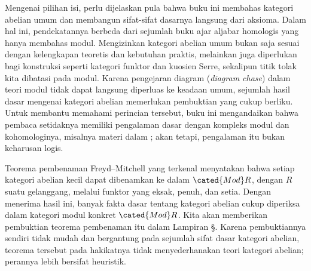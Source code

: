 Mengenai pilihan isi, perlu dijelaskan pula bahwa buku ini membahas
kategori abelian umum dan membangun sifat-sifat dasarnya langsung dari
aksioma. Dalam hal ini, pendekatannya berbeda dari sejumlah buku ajar
aljabar homologis yang hanya membahas modul. Mengizinkan kategori abelian
umum bukan saja sesuai dengan kelengkapan teoretis dan kebutuhan praktis,
melainkan juga diperlukan bagi konstruksi seperti kategori funktor dan
kuosien Serre, sekalipun titik tolak kita dibatasi pada modul. Karena
pengejaran diagram (\emph{diagram chase}) dalam teori modul tidak dapat
langsung diperluas ke keadaan umum, sejumlah hasil dasar mengenai kategori
abelian memerlukan
pembuktian yang cukup berliku. Untuk membantu memahami perincian tersebut,
buku ini mengandaikan bahwa pembaca setidaknya memiliki pengalaman dasar
dengan kompleks modul dan kohomologinya, misalnya materi dalam
\cite[Bab~6]{Li1}; akan tetapi, pengalaman itu bukan keharusan logis.

Teorema pembenaman Freyd--Mitchell yang terkenal menyatakan bahwa setiap
kategori abelian kecil dapat dibenamkan ke dalam $\cated{Mod}R$, dengan
$R$ suatu gelanggang, melalui funktor yang eksak, penuh, dan setia. Dengan
menerima hasil ini, banyak fakta dasar tentang kategori abelian cukup diperiksa
dalam kategori modul konkret $\cated{Mod}R$. Kita akan
memberikan pembuktian teorema pembenaman itu dalam Lampiran
\S{}. Karena pembuktiannya sendiri tidak mudah dan bergantung
pada sejumlah sifat dasar kategori abelian, teorema tersebut pada
hakikatnya tidak menyederhanakan teori kategori abelian; perannya lebih
bersifat heuristik.
